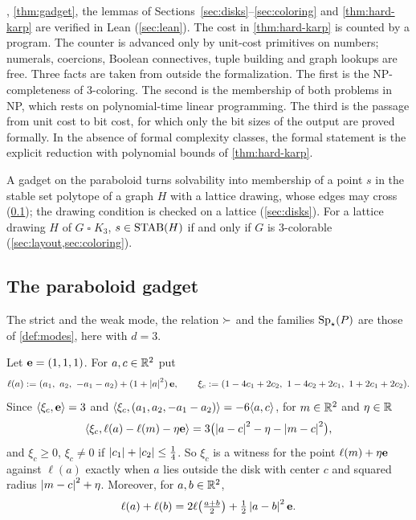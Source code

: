 \begin{remark}\label{rem:hard-scope}
, \cref{thm:gadget}, the lemmas of Sections~\ref{sec:disks}--\ref{sec:coloring} and \cref{thm:hard-karp} are verified in Lean (\cref{sec:lean}). The cost in \cref{thm:hard-karp} is counted by a program. The counter is advanced only by unit-cost primitives on numbers; numerals, coercions, Boolean connectives, tuple building and graph lookups are free. Three facts are taken from outside the formalization. The first is the NP-completeness of 3-coloring. The second is the membership of both problems in NP, which rests on polynomial-time linear programming. The third is the passage from unit cost to bit cost, for which only the bit sizes of the output are proved formally. In the absence of formal complexity classes, the formal statement is the explicit reduction with polynomial bounds of \cref{thm:hard-karp}.
\end{remark}

A gadget on the paraboloid turns solvability into membership of a point $s$ in the stable set polytope of a graph $H$ with a lattice drawing, whose edges may cross (\cref{sec:gadget}); the drawing condition is checked on a lattice (\cref{sec:disks}). For a lattice drawing $H$ of $G\mathbin{\square}K_3$, $s\in\operatorname{STAB}(H)$ if and only if $G$ is 3-colorable (\cref{sec:layout,sec:coloring}).

\subsection{The paraboloid gadget}\label{sec:gadget}

The strict and the weak mode, the relation $\mathrel{\succ}$ and the families $\operatorname{Sp}_\star(P)$ are those of \cref{def:modes}, here with $d=3$.

Let $\mathbf e=(1,1,1)$. For $a,c\in\mathbb{R}^2$ put
\[
\ell(a):=(a_1,\ a_2,\ -a_1-a_2)+(1+\left\lvert a \right\rvert^2)\,\mathbf e,\qquad
\xi_c:=(1-4c_1+2c_2,\ 1-4c_2+2c_1,\ 1+2c_1+2c_2).
\]
Since $\langle \xi_c, \mathbf e\rangle=3$ and $\langle \xi_c, (a_1,a_2,-a_1-a_2)\rangle=-6\langle a, c\rangle$, for $m\in\mathbb{R}^2$ and $\eta\in\mathbb{R}$
\begin{equation}\label{eq:hard-wit}
\langle \xi_c, \ell(a)-\ell(m)-\eta\mathbf e\rangle=3\bigl(\left\lvert a-c \right\rvert^2-\eta-\left\lvert m-c \right\rvert^2\bigr),
\end{equation}
and $\xi_c\ge0$, $\xi_c\ne0$ if $\left\lvert c_1 \right\rvert+\left\lvert c_2 \right\rvert\le\frac14$. So $\xi_c$ is a witness for the point $\ell(m)+\eta\mathbf e$ against $\ell(a)$ exactly when $a$ lies outside the disk with center $c$ and squared radius $\left\lvert m-c \right\rvert^2+\eta$. Moreover, for $a,b\in\mathbb{R}^2$,
\begin{equation}\label{eq:hard-chord}
\ell(a)+\ell(b)=2\ell\bigl(\tfrac{a+b}2\bigr)+\tfrac12\left\lvert a-b \right\rvert^2\mathbf e.
\end{equation}

